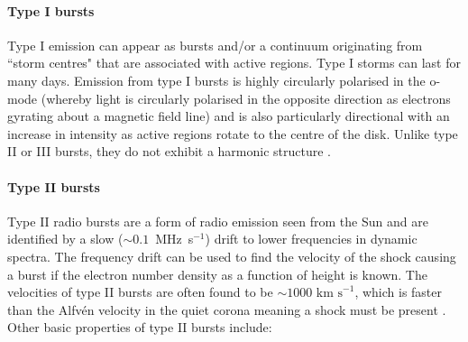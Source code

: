 \paragraph{Type I bursts}
Type I emission can appear as bursts and/or a continuum originating from ``storm centres" that are associated with active regions. Type I storms can last for many days. Emission from type I bursts is highly circularly polarised in the o-mode (whereby light is circularly polarised in the opposite direction as electrons gyrating about a magnetic field line) and is also particularly directional with an increase in intensity as active regions rotate to the centre of the disk. Unlike type II or III bursts, they do not exhibit a harmonic structure \citep{McLean1985}.
\paragraph{Type II bursts}
Type II radio bursts are a form of radio emission seen from the Sun and are identified by a slow ($\sim 0.1$~MHz~s$^{-1}$) drift to lower frequencies in dynamic spectra. The frequency drift can be used to find the velocity of the shock causing a burst if the electron number density as a function of height is known. The velocities of type II bursts are often found to be $\sim 1000 \mbox{ km s}^{-1}$, which is faster than the Alfv\'{e}n velocity in the quiet corona meaning a shock must be present \citep{NelsonandMelrose1985}. Other basic properties of type II bursts include:
